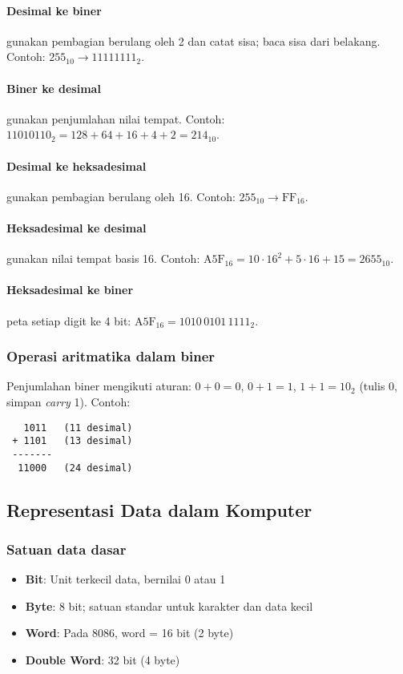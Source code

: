 \paragraph{Desimal ke biner} gunakan pembagian berulang oleh 2 dan catat sisa; baca sisa dari belakang. Contoh: \(255_{10} \to 11111111_2\).
\paragraph{Biner ke desimal} gunakan penjumlahan nilai tempat. Contoh: \(11010110_2 = 128+64+16+4+2 = 214_{10}\).
\paragraph{Desimal ke heksadesimal} gunakan pembagian berulang oleh 16. Contoh: \(255_{10} \to \mathrm{FF}_{16}\).
\paragraph{Heksadesimal ke desimal} gunakan nilai tempat basis 16. Contoh: \(\mathrm{A5F}_{16} = 10\cdot 16^2 + 5\cdot 16 + 15 = 2655_{10}\).
\paragraph{Heksadesimal ke biner} peta setiap digit ke 4 bit: \(\mathrm{A5F}_{16} = 1010\,0101\,1111_2\).

\subsubsection{Operasi aritmatika dalam biner}
Penjumlahan biner mengikuti aturan: \(0+0=0\), \(0+1=1\), \(1+1=10_2\) (tulis 0, simpan \textit{carry} 1). Contoh:
\begin{verbatim}
   1011   (11 desimal)
 + 1101   (13 desimal)
 -------
  11000   (24 desimal)
\end{verbatim}

\subsection{Representasi Data dalam Komputer}\label{subsec:pengenalan-representasi-data}

\subsubsection{Satuan data dasar}
\begin{itemize}
    \item \textbf{Bit}: Unit terkecil data, bernilai 0 atau 1
    \item \textbf{Byte}: 8 bit; satuan standar untuk karakter dan data kecil
    \item \textbf{Word}: Pada 8086, word = 16 bit (2 byte)
    \item \textbf{Double Word}: 32 bit (4 byte)
\end{itemize}

